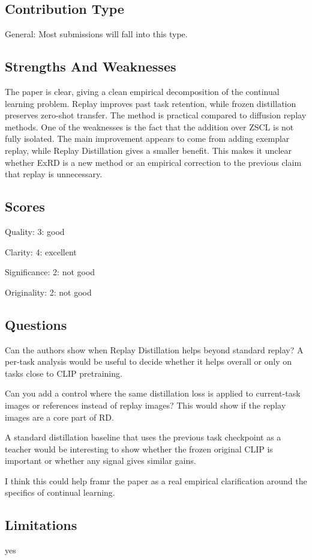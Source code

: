 \documentclass[11pt]{article}
\begin{document}
\subsection*{Contribution Type}
General: Most submissions will fall into this type.

\subsection*{Strengths And Weaknesses}
The paper is clear, giving a clean empirical decomposition of the continual learning problem. Replay improves past task retention, while frozen distillation preserves zero-shot transfer. The method is practical compared to diffusion replay methods. One of the weaknesses is the fact that the addition over ZSCL is not fully isolated. The main improvement appears to come from adding exemplar replay, while Replay Distillation gives a smaller benefit. This makes it unclear whether ExRD is a new method or an empirical correction to the previous claim that replay is unnecessary.

\subsection*{Scores}
Quality: 3: good

Clarity: 4: excellent

Significance: 2: not good

Originality: 2: not good

\subsection*{Questions}
Can the authors show when Replay Distillation helps beyond standard replay? A per-task analysis would be useful to decide whether it helps overall or only on tasks close to CLIP pretraining.

Can you add a control where the same distillation loss is applied to current-task images or references instead of replay images? This would show if the replay images are a core part of RD.

A standard distillation baseline that uses the previous task checkpoint as a teacher would be interesting to show whether the frozen original CLIP is important or whether any signal gives similar gains.

I think this could help framr the paper as a real empirical clarification around the specifics of continual learning.

\subsection*{Limitations}
yes
\end{document}
